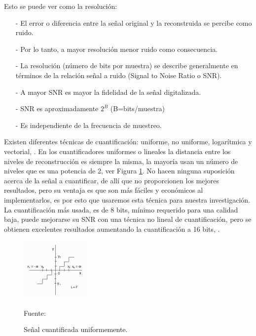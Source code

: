 \begin{enumerate}
\begin{enumerate}
Esto se puede ver como la resolución:
\begin{enumerate}
\item[-]El error o diferencia entre la señal original y la reconstruida se percibe como ruido.
\item[-]Por lo tanto, a mayor resolución menor ruido como consecuencia.
\item[-]La resolución (número de bits por muestra) se describe generalmente en términos de la relación señal a ruido (Signal to Noise Ratio o SNR).
\item[-]A mayor SNR es mayor la fidelidad de la señal digitalizada.
\item[-]SNR es aproximadamente $2^B$ (B=bits/muestra)
\item[-]Es independiente de la frecuencia de muestreo.
\end{enumerate}
\vskip 0.3cm
Existen diferentes técnicas de cuantificación: uniforme, no uniforme, logarítmica y vectorial, \cite{rama}. En los cuantificadores uniformes o lineales la distancia entre los niveles de reconstrucción es siempre la misma, la mayoría usan un número de niveles que es una potencia de 2, ver Figura \ref{fig:figura2.12}. No hacen ninguna suposición acerca de la señal a cuantificar, de allí que no proporcionen los mejores resultados, pero su ventaja es que son más fáciles y económicos al implementarlos, es por esto que usaremos esta técnica para nuestra investigación.
\vskip 0.4cm
La cuantificación más usada, es de 8 bits, mínimo requerido para una calidad baja, puede mejorarse su SNR con una técnica no lineal de cuantificación, pero se obtienen excelentes resultados aumentando la cuantificación a 16 bits, \cite{kaifu}.
\begin{figure}[ht]
\begin{center}
\includegraphics[width=0.3\textwidth]{Imagenes/Cap2/image012}
\end{center}
\begin{center}
\vskip -0.5cm
\caption{\small{Señal cuantificada uniformemente.}}
\label{fig:figura2.12}
{\small{Fuente: \cite{rama}}}
\end{center}
\end{figure}
\end{enumerate}


\end{enumerate}
